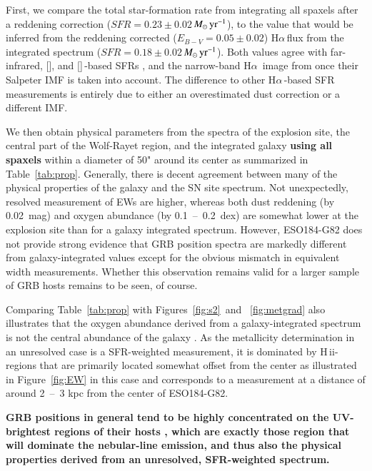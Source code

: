 \documentclass[traditabstract]{aa}
\newcommand{\ha}{H$\alpha$}
\newcommand{\hii}{\mbox{H\,{\sc ii}}}
\newcommand{\oi}{[\ion{O}{i}]}
\newcommand{\cii}{[\ion{C}{ii}]}
\newcommand{\Msunyr}{$M_\odot\,\rm{yr}^{-1}$}
\begin{document}
First, we compare the total star-formation rate from integrating all spaxels after a reddening correction ($SFR=0.23\pm0.02$\,\Msunyr), to the value that would be inferred from the reddening corrected ($E_{B-V}=0.05\pm0.02$) \ha\,flux from the integrated spectrum ($SFR=0.18\pm0.02$\,\Msunyr). Both values agree with far-infrared, \oi, and \cii\,-based SFRs \citep{2014A&A...562A..70M, 2016arXiv160901742M}, and the narrow-band \ha\, image from \citet{2005NewA...11..103S} once their Salpeter IMF is taken into account. The difference to other \ha\,-based SFR measurements \citep{2006A&A...454..103H, 2008A&A...490...45C} is entirely due to either an overestimated dust correction or a different IMF.

We then obtain physical parameters from the spectra of the explosion site, the central part of the Wolf-Rayet region, and the integrated galaxy \textbf{using all spaxels} within a diameter of 50" around its center as summarized in Table~\ref{tab:prop}. Generally, there is decent agreement between many of the physical properties of the galaxy and the SN site spectrum. Not unexpectedly, resolved measurement of EWs are higher, whereas both dust reddening (by 0.02~mag) and oxygen abundance (by 0.1~--~0.2~dex) are somewhat lower at the explosion site than for a galaxy integrated spectrum. However, ESO184-G82 does not provide strong evidence that GRB position spectra are markedly different from galaxy-integrated values except for the obvious mismatch in equivalent width measurements. Whether this observation remains valid for a larger sample of GRB hosts remains to be seen, of course. 

Comparing Table~\ref{tab:prop} with Figures~\ref{fig:s2}~and ~\ref{fig:metgrad} also illustrates that the oxygen abundance derived from a galaxy-integrated spectrum is not the central abundance of the galaxy \citep[see also e.g.,][]{2016A&A...591A..48G}. As the metallicity determination in an unresolved case is a SFR-weighted measurement, it is dominated by \hii-regions that are primarily located somewhat offset from the center as illustrated in Figure~\ref{fig:EW} in this case and corresponds to a measurement at a distance of around 2~--~3 kpc from the center of ESO184-G82. 

\textbf{GRB positions in general tend to be highly concentrated on the UV-brightest regions of their hosts \citep[e.g.,][]{2010MNRAS.405...57S, 2016ApJ...817..144B, 2017MNRAS.tmp..220L}, which are exactly those region that will dominate the nebular-line emission, and thus also the physical properties derived from an unresolved, SFR-weighted spectrum.}
\end{document}
